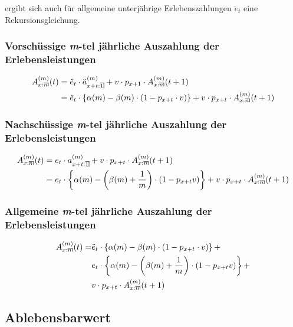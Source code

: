 \documentclass[a4paper,10pt]{article}
\makeatletter
\newcommand{\xn}{{\act[x]{n}}}
\DeclareRobustCommand{\act}[2][]{%
\def\arraystretch{0}%
\setlength\arraycolsep{0.5pt}%
\setlength\arrayrulewidth{0.5pt}%
\setbox0=\hbox{$\scriptstyle#1\ifx#1\empty{asdf}\else:\fi#2$}%
\begin{array}[b]{*2{@{}>{\scriptstyle}c}|}
\cline{2-2}%
\rule[1.25pt]{0pt}{\ht0}%
#1\ifx#1\empty\else:\fi & #2%
\end{array}%
}
\makeatother
\begin{document}
ergibt sich auch für allgemeine unterjährige Erlebenszahlungen $\ddot{e}_t$ eine Rekursionsgleichung.

\subsubsection{Vorschüssige \textit{m}-tel jährliche Auszahlung der Erlebensleistungen}


\begin{align*}
A^{(m)}_\xn(t) &= \ddot{e}_t \cdot \ddot{a}_{\act[x+t]{1}}^{(m)} + v \cdot p_{x+1} \cdot A^{(m)}_\xn(t+1)\\
  &= \ddot{e}_t \cdot \left\{\alpha(m)  - \beta(m) \cdot \left(1-p_{x+t} \cdot v\right)\right\} + v\cdot p_{x+t} \cdot A^{(m)}_\xn(t+1)
\end{align*}


\subsubsection{Nachschüssige \textit{m}-tel jährliche Auszahlung der Erlebensleistungen}

\begin{align*}
A^{(m)}_\xn(t) &= e_t \cdot a_{\act[x+t]{1}}^{(m)} + v \cdot p_{x+t} \cdot A^{(m)}_\xn(t+1)\\
   &= e_t\cdot\left\{\alpha(m) - \left(\beta(m)+\frac1m\right)\cdot\left(1-p_{x+t} v\right)\right\} + v\cdot p_{x+t} \cdot A^{(m)}_\xn(t+1)
\end{align*}

\subsubsection{Allgemeine \textit{m}-tel jährliche Auszahlung der Erlebensleistungen}


\begin{align*}
A^{(m)}_\xn(t) = &\ddot{e}_t \cdot \left\{\alpha(m)  - \beta(m) \cdot \left(1-p_{x+t} \cdot v\right)\right\} +  \\
 &e_t\cdot\left\{\alpha(m) - \left(\beta(m)+\frac1m\right)\cdot\left(1-p_{x+t} v\right)\right\} + \\
 &v\cdot p_{x+t} \cdot A^{(m)}_\xn(t+1)
\end{align*}




\subsection{Ablebensbarwert}
\end{document}
